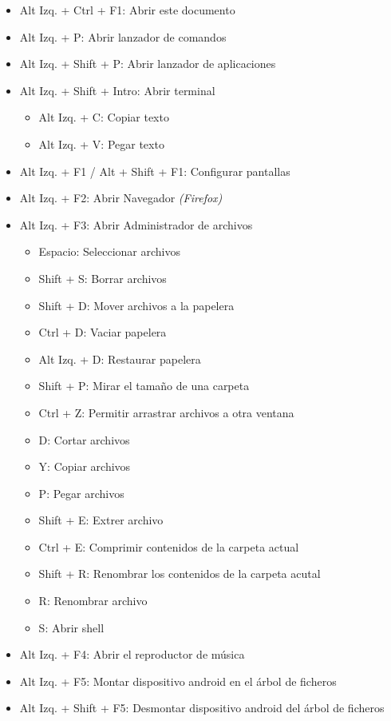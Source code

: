 \documentclass[12pt]{article}
\begin{document}
\begin{itemize}
\setlength\itemsep{-0.2em}
\item Alt Izq. + Ctrl + F1: Abrir este documento
\item Alt Izq. + P: Abrir lanzador de comandos
\item Alt Izq. + Shift + P: Abrir lanzador de aplicaciones
\item Alt Izq. + Shift + Intro: Abrir terminal
\begin{itemize}
\setlength\itemsep{-0.2em}
\item Alt Izq. + C: Copiar texto
\item Alt Izq. + V: Pegar texto
\end{itemize}
\item Alt Izq. + F1 / Alt + Shift + F1: Configurar pantallas
\item Alt Izq. + F2: Abrir Navegador \emph{(Firefox)}
\item Alt Izq. + F3: Abrir Administrador de archivos
\begin{itemize}
\setlength\itemsep{-0.2em}
\item Espacio: Seleccionar archivos
\item Shift + S: Borrar archivos
\item Shift + D: Mover archivos a la papelera
\item Ctrl + D: Vaciar papelera
\item Alt Izq. + D: Restaurar papelera
\item Shift + P: Mirar el tamaño de una carpeta
\item Ctrl + Z: Permitir arrastrar archivos a otra ventana
\item D: Cortar archivos
\item Y: Copiar archivos
\item P: Pegar archivos
\item Shift + E: Extrer archivo
\item Ctrl + E: Comprimir contenidos de la carpeta actual
\item Shift + R: Renombrar los contenidos de la carpeta acutal
\item R: Renombrar archivo
\item S: Abrir shell
\end{itemize}
\item Alt Izq. + F4: Abrir el reproductor de música
\item Alt Izq. + F5: Montar dispositivo android en el árbol de ficheros
\item Alt Izq. + Shift + F5: Desmontar dispositivo android del árbol de ficheros

\end{itemize}
\end{document}
